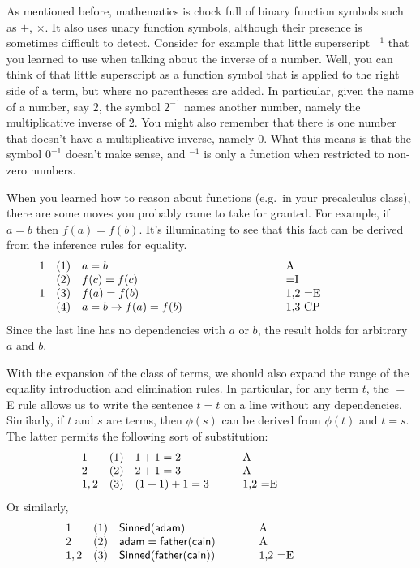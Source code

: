 As mentioned before, mathematics is chock full of binary function
symbols such as $+$, $\times$.  It also uses unary function symbols,
although their presence is sometimes difficult to detect.  Consider
for example that little superscript $^{-1}$ that you learned to use
when talking about the inverse of a number.  Well, you can think of
that little superscript as a function symbol that is applied to the
right side of a term, but where no parentheses are added.  In
particular, given the name of a number, say $2$, the symbol $2^{-1}$
names another number, namely the multiplicative inverse of $2$.  You
might also remember that there is one number that doesn't have a
multiplicative inverse, namely $0$.  What this means is that the
symbol $0^{-1}$ doesn't make sense, and $^{-1}$ is only a function
when restricted to non-zero numbers.

When you learned how to reason about functions (e.g.\ in your
precalculus class), there are some moves you probably came to take for
granted.  For example, if $a=b$ then $f(a)=f(b)$.  It's illuminating
to see that this fact can be derived from the inference rules for equality.
 \[ \begin{array}{l l >{$}p{6cm}<{$} p{3cm}}
  1  & (1) & a=b & A \\    
     & (2) & f(c)=f(c) & $=$I  \\
  1  & (3) & f(a)=f(b) & 1,2 $=$E \\
      & (4) & a=b\to f(a)=f(b) & 1,3 CP \end{array} \]
Since the last line has no dependencies with $a$ or $b$, the result
holds for arbitrary $a$ and $b$.


With the expansion of the class of terms, we should also expand the
range of the equality introduction and elimination rules.  In
particular, for any term $t$, the $=$E rule allows us to write the
sentence $t=t$ on a line without any dependencies.  Similarly, if $t$
and $s$ are terms, then $\phi (s)$ can be derived from $\phi (t)$ and
$t=s$.  The latter permits the following sort of substitution:
\[ \begin{array}{l l >{$}p{3cm}<{$} p{3cm}}
     1 &   (1) & 1+1=2 & A \\
     2 &   (2) & 2+1=3 & A \\
     1,2 & (3) & (1+1)+1=3 & 1,2 $=$E \end{array} \]
 Or similarly,
 \[ \begin{array}{l l >{$}p{4cm}<{$} p{3cm}}
      1 & (1) & \mathsf{Sinned}(\mathsf{adam}) & A \\
      2 & (2) & \mathsf{adam}=\mathsf{father}(\mathsf{cain}) & A \\
      1,2 & (3) &
                  \mathsf{Sinned}(\mathsf{father}(\mathsf{cain})) &
                                                                    1,2
                                                                    $=$E \end{array} \]



